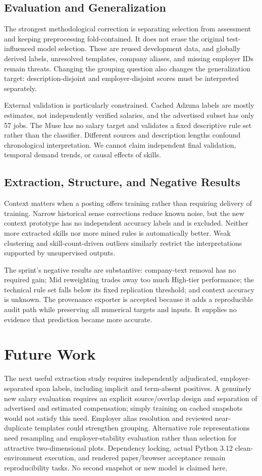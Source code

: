 \documentclass[sigconf,nonacm]{acmart}
\begin{document}
\subsection{Evaluation and Generalization}
The strongest methodological correction is separating selection from assessment and keeping preprocessing fold-contained. It does not erase the original test-influenced model selection. These are reused development data, and globally derived labels, unresolved templates, company aliases, and missing employer IDs remain threats. Changing the grouping question also changes the generalization target: description-disjoint and employer-disjoint scores must be interpreted separately.

External validation is particularly constrained. Cached Adzuna labels are mostly estimates, not independently verified salaries, and the advertised subset has only 57 jobs. The Muse has no salary target and validates a fixed descriptive rule set rather than the classifier. Different sources and description lengths confound chronological interpretation. We cannot claim independent final validation, temporal demand trends, or causal effects of skills.

\subsection{Extraction, Structure, and Negative Results}
Context matters when a posting offers training rather than requiring delivery of training. Narrow historical sense corrections reduce known noise, but the new context prototype has no independent accuracy labels and is excluded. Neither more extracted skills nor more mined rules is automatically better. Weak clustering and skill-count-driven outliers similarly restrict the interpretations supported by unsupervised outputs.

The sprint's negative results are substantive: company-text removal has no required gain; Mid reweighting trades away too much High-tier performance; the technical rule set falls below its fixed replication threshold; and context accuracy is unknown. The provenance exporter is accepted because it adds a reproducible audit path while preserving all numerical targets and inputs. It supplies no evidence that prediction became more accurate.

\section{Future Work}
The next useful extraction study requires independently adjudicated, employer-separated span labels, including implicit and term-absent positives. A genuinely new salary evaluation requires an explicit source/overlap design and separation of advertised and estimated compensation; simply training on cached snapshots would not satisfy this need. Employer alias resolution and reviewed near-duplicate templates could strengthen grouping. Alternative role representations need resampling and employer-stability evaluation rather than selection for attractive two-dimensional plots. Dependency locking, actual Python 3.12 clean-environment execution, and rendered paper/browser acceptance remain reproducibility tasks. No second snapshot or new model is claimed here.
\end{document}
